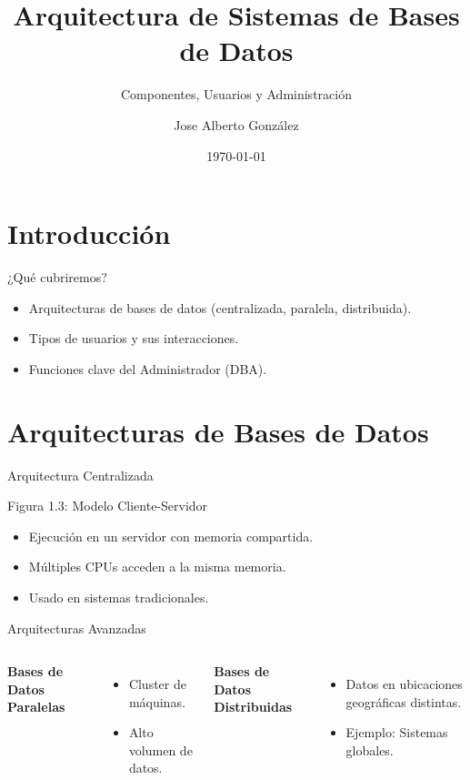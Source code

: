 \documentclass{beamer}
\title{Arquitectura de Sistemas de Bases de Datos}
\subtitle{Componentes, Usuarios y Administración}
\author{Jose Alberto González }
\date{\today}
\institute{Universidad o Empresa}
\begin{document}
\begin{frame}
  \titlepage
\end{frame}

\section{Introducción}
\begin{frame}{¿Qué cubriremos?}
  \begin{itemize}
    \item Arquitecturas de bases de datos (centralizada, paralela, distribuida).
    \item Tipos de usuarios y sus interacciones.
    \item Funciones clave del Administrador (DBA).
  \end{itemize}
\end{frame}

\section{Arquitecturas de Bases de Datos}
\begin{frame}{Arquitectura Centralizada}
  \begin{block}{Figura 1.3: Modelo Cliente-Servidor}
    \begin{itemize}
      \item Ejecución en un servidor con memoria compartida.
      \item Múltiples CPUs acceden a la misma memoria.
      \item Usado en sistemas tradicionales.
    \end{itemize}
    \end{block}
  \centering
\end{frame}

\begin{frame}{Arquitecturas Avanzadas}
  \begin{columns}
      \textbf{Bases de Datos Paralelas}
      \begin{itemize}
        \item Cluster de máquinas.
        \item Alto volumen de datos.
      \end{itemize}
      \textbf{Bases de Datos Distribuidas}
      \begin{itemize}
        \item Datos en ubicaciones geográficas distintas.
        \item Ejemplo: Sistemas globales.
      \end{itemize}
  \end{columns}
\end{frame}
\end{document}

